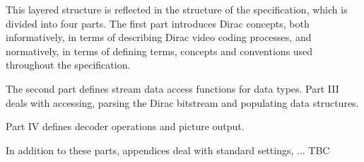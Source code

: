 This layered structure is reflected in the structure of the specification,
which is divided into four parts. The first part introduces Dirac concepts,
both informatively, in terms of describing Dirac video coding processes, and
normatively, in terms of defining terms, concepts and conventions used 
throughout the specification.

The second part defines stream data access functions for data types. Part III
deals with accessing, parsing the Dirac bitstream and populating data
structures.

Part IV defines decoder operations and picture output.

In addition to these parts, appendices deal with standard settings, ... TBC

